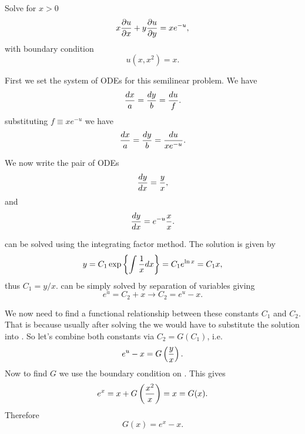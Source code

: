 Solve for $x > 0$
\begin{equation}
  x {\partial u \over \partial x} + y {\partial u \over \partial y} = x e^{-u},
\end{equation}
with boundary condition
\begin{equation}
  u(x, x^2) = x.
  \label{eq_boundary_cond}
\end{equation}

First we set the system of ODEs for this semilinear problem. We have
\begin{equation}
  {dx \over a} = {dy \over b} = {du \over f}.
\end{equation}
substituting $f \equiv x e^{-u}$ we have
\begin{equation}
  {dx \over a} = {dy \over b} = {du \over x e^{-u}}.
\end{equation}

We now write the pair of ODEs
\begin{equation}
  {dy \over dx} = {y \over x},
  \label{eq_char_eq_one}
\end{equation}
and
\begin{equation}
  {dy \over dx} = e^{-u} {x \over x}.
  \label{eq_char_eq_two}
\end{equation}

 can be solved using the integrating factor method. The
solution is given by
\begin{equation}
  y = C_1 \exp \left\{ \int {1 \over x} dx \right\} = C_1 e^{\ln x} = C_1 x,
\end{equation}
thus $C_1 = y / x$.  can be simply solved by separation of
variables giving
\begin{equation}
  e^u = C_2 + x \rightarrow C_2 = e^u - x.
\end{equation}

We now need to find a functional relationship between these constants $C_1$ and
$C_2$. That is because usually after solving the  we would
have to substitute the solution into . So let's combine
both constants via $C_2 = G(C_1)$, i.e.
\begin{equation}
  e^u - x = G\left( {y \over x} \right).
\end{equation}
Now to find $G$ we use the boundary condition on . This
gives
\begin{equation}
  e^x = x + G \left( {x^2 \over x} \right) = x = G(x).
\end{equation}
Therefore
\begin{equation}
  G(x) = e^x - x.
  \label{eq_sol_ODE}
\end{equation}

